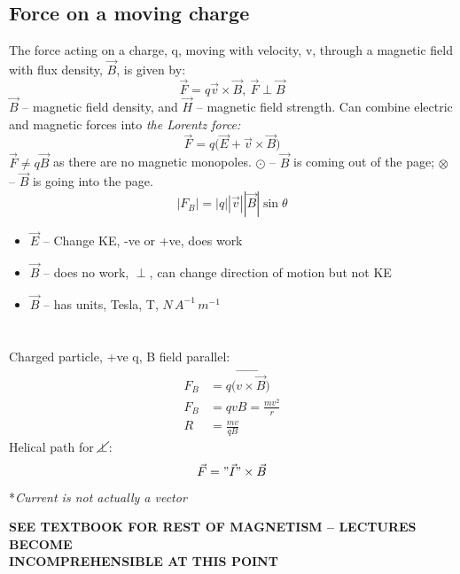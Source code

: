 \documentclass[a4paper, 11pt, normalem]{report}
\begin{document}
\section{Force on a moving charge}
The force acting on a charge, q, moving with velocity, v, through a magnetic field with flux density, $\vec{B}$, is given by:
\begin{equation}
    \vec{F} = q\vec{v} \times \vec{B}, ~ \vec{F} \perp \vec{B}
\end{equation}
$\vec{B}$ -- magnetic field density, and $\vec{H}$ -- magnetic field strength.
Can combine electric and magnetic forces into \emph{the Lorentz force:}
\begin{equation}
    \vec{F} = q \big( \vec{E} + \vec{v} \times \vec{B} \big)
\end{equation}
$\vec{F} \neq q\vec{B}$ as there are no magnetic monopoles.
$\odot$ -- $\vec{B}$ is coming out of the page; $\otimes$ -- $\vec{B}$ is going into the page.
\begin{equation}
    |F_{B}| = |q||\vec{v}||\vec{B}|\sin\theta
\end{equation}
\begin{itemize}
    \item $\vec{E}$ -- Change KE, -ve or +ve, does work
    \item $\vec{B}$ -- does no work, $\perp$, can change direction of motion but not KE
    \item $\vec{B}$ -- has units, Tesla, T, $N\,A^{-1}\,m^{-1}$
\end{itemize}

\chapter{}
Charged particle, +ve q, B field parallel:
\begin{align}
    F_{B} &= q\big(\vec{v \times \vec{B}} \big)\\
    F_{B} &= qvB = \frac{mv^{2}}{r} \\
    R &= \frac{mv}{qB}
\end{align}
Helical path for $\cancel{\perp}$:
\begin{equation}
    \vec{F} = "\vec{I}" \times \vec{B}
\end{equation}
*\textit{Current is not actually a vector}

\textbf{SEE TEXTBOOK FOR REST OF MAGNETISM -- LECTURES BECOME \\ INCOMPREHENSIBLE AT THIS POINT}
\end{document}
